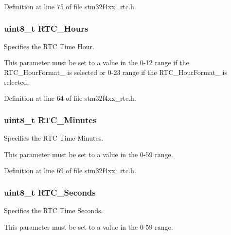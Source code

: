 Definition at line 75 of file stm32f4xx\-\_\-rtc.\-h.

\hypertarget{struct_r_t_c___time_type_def_a477121009a567d6dd0e5fa1310574d32}{
\subsubsection[{R\-T\-C\-\_\-\-Hours}]{\setlength{\rightskip}{0pt plus 5cm}uint8\-\_\-t R\-T\-C\-\_\-\-Hours}}\label{struct_r_t_c___time_type_def_a477121009a567d6dd0e5fa1310574d32}
\begin{DoxyVerb} Specifies the RTC Time Hour.
\end{DoxyVerb}
 This parameter must be set to a value in the 0-\/12 range if the R\-T\-C\-\_\-\-Hour\-Format\-\_ is selected or 0-\/23 range if the R\-T\-C\-\_\-\-Hour\-Format\-\_ is selected. 

Definition at line 64 of file stm32f4xx\-\_\-rtc.\-h.

\hypertarget{struct_r_t_c___time_type_def_ae6454acb26dbaa987a4f39b992074394}{
\subsubsection[{R\-T\-C\-\_\-\-Minutes}]{\setlength{\rightskip}{0pt plus 5cm}uint8\-\_\-t R\-T\-C\-\_\-\-Minutes}}\label{struct_r_t_c___time_type_def_ae6454acb26dbaa987a4f39b992074394}
\begin{DoxyVerb} Specifies the RTC Time Minutes.
\end{DoxyVerb}
 This parameter must be set to a value in the 0-\/59 range. 

Definition at line 69 of file stm32f4xx\-\_\-rtc.\-h.

\hypertarget{struct_r_t_c___time_type_def_a8c07c311d80e32ef93c46d5e5a701105}{
\subsubsection[{R\-T\-C\-\_\-\-Seconds}]{\setlength{\rightskip}{0pt plus 5cm}uint8\-\_\-t R\-T\-C\-\_\-\-Seconds}}\label{struct_r_t_c___time_type_def_a8c07c311d80e32ef93c46d5e5a701105}
\begin{DoxyVerb} Specifies the RTC Time Seconds.
\end{DoxyVerb}
 This parameter must be set to a value in the 0-\/59 range. 

